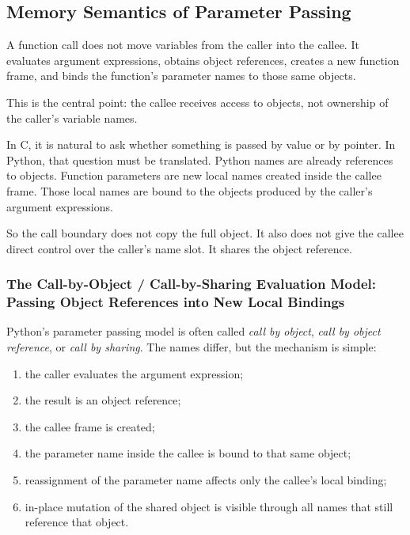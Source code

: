 \subsection{Memory Semantics of Parameter Passing}

A function call does not move variables from the caller into the callee. It evaluates argument expressions, obtains object references, creates a new function frame, and binds the function's parameter names to those same objects.

This is the central point: the callee receives access to objects, not ownership of the caller's variable names.

In C, it is natural to ask whether something is passed by value or by pointer. In Python, that question must be translated. Python names are already references to objects. Function parameters are new local names created inside the callee frame. Those local names are bound to the objects produced by the caller's argument expressions.

So the call boundary does not copy the full object. It also does not give the callee direct control over the caller's name slot. It shares the object reference.

\subsubsection{The Call-by-Object / Call-by-Sharing Evaluation Model: Passing Object References into New Local Bindings}

Python's parameter passing model is often called \textit{call by object}, \textit{call by object reference}, or \textit{call by sharing}. The names differ, but the mechanism is simple:

\begin{enumerate}
    \item the caller evaluates the argument expression;
    \item the result is an object reference;
    \item the callee frame is created;
    \item the parameter name inside the callee is bound to that same object;
    \item reassignment of the parameter name affects only the callee's local binding;
    \item in-place mutation of the shared object is visible through all names that still reference that object.
\end{enumerate}


